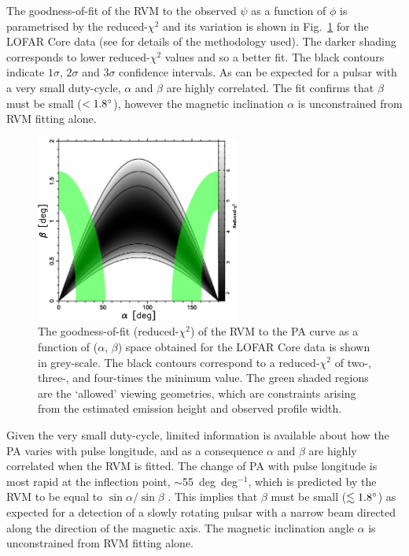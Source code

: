 The goodness-of-fit of the RVM to the observed $\psi$ as a function of $\phi$ is parametrised by the reduced-$\chi^2$ and its variation is shown in Fig.~\ref{fig: J0250 - banana} for the LOFAR Core data (see \citealt{RWJx2015a} for details of the methodology used). The darker shading corresponds to lower reduced-$\chi^2$ values and so a better fit. The black contours indicate $1\sigma$, $2\sigma$ and $3\sigma$ confidence intervals. As can be expected for a pulsar with a very small duty-cycle, $\alpha$ and $\beta$ are highly correlated. The fit confirms that $\beta$ must be small ($<1.8^\circ$), however the magnetic inclination $\alpha$ is unconstrained from RVM fitting alone.
\begin{figure}
    \begin{center}
        \includegraphics[width=0.6\textwidth]{Figures/J0250/banana.pdf}
        \caption[The goodness-of-fit of the RVM to the PSR~J0250+5854 PA curve]{The goodness-of-fit (reduced-$\chi^2$) of the RVM to the PA curve as a function of ($\alpha$, $\beta$) space obtained for the LOFAR Core data is shown in grey-scale. The black contours correspond to a reduced-$\chi^2$ of two-, three-, and four-times the minimum value. The green shaded regions are the `allowed' viewing geometries, which are constraints arising from the estimated emission height and observed profile width.}
        \label{fig: J0250 - banana}
    \end{center}
\end{figure}

Given the very small duty-cycle, limited information is available about how the PA varies with pulse longitude, and as a consequence $\alpha$ and $\beta$ are highly correlated when the RVM is fitted. The change of PA with pulse longitude is most rapid at the inflection point, $\sim$55~deg~deg$^{-1}$, which is predicted by the RVM to be equal to $\sin\alpha / \sin \beta$ \citep{Kxxx1970}. This implies that $\beta$ must be small ($\lesssim1.8^\circ$) as expected for a detection of a slowly rotating pulsar with a narrow beam directed along the direction of the magnetic axis. The magnetic inclination angle $\alpha$ is unconstrained from RVM fitting alone.


